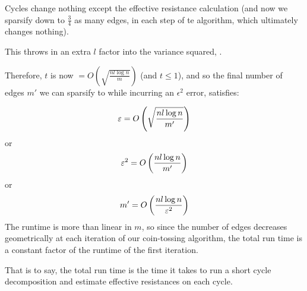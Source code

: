     Cycles change nothing except the effective resistance calculation (and now
    we sparsify down to $\frac{3}{4}$ as many edges, in each step of te
    algorithm, which ultimately changes nothing).

    This throws in an extra $l$ factor into the variance squared,
    .

    Therefore, $t$ is now $= O\left(\sqrt{\frac{nl \log n}{m}}\right)$ (and $t
    \leq 1$), and so the final number of edges $m'$ we can sparsify to while
    incurring an $\epsilon^2$ error, satisfies:

    \begin{align}
       \varepsilon = O\left(\sqrt{\frac{nl \log n}{m'}}\right)
    \end{align}
    or
    \begin{align}
       \varepsilon^2 = O\left(\frac{nl \log n}{m'}\right)
    \end{align}
    or
    \begin{align}
       m' = O\left(\frac{nl \log n}{\varepsilon^2}\right)
    \end{align}
    The runtime is more than linear in $m$, so since the number of edges
    decreases geometrically at each iteration of our coin-tossing algorithm,
    the total run time is a constant factor of the runtime of the first iteration.

    That is to say, the total run time is the time it takes to run a short cycle
    decomposition and estimate effective resistances on each cycle.


   


